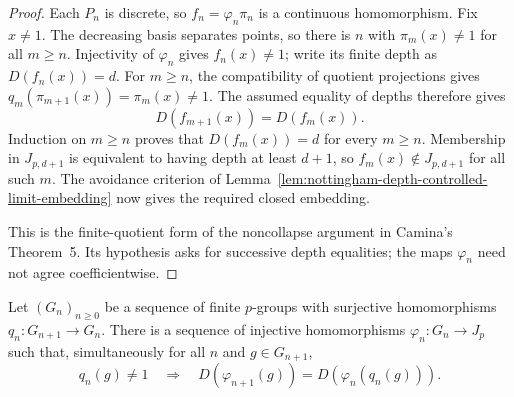 \begin{proof}
Each $P_n$ is discrete, so $f_n=\varphi_n\pi_n$ is a continuous
homomorphism. Fix $x\ne1$. The decreasing basis separates points,
so there is $n$ with $\pi_m(x)\ne1$ for all $m\ge n$.
Injectivity of $\varphi_n$ gives $f_n(x)\ne1$; write its finite
depth as $D(f_n(x))=d$.
For $m\ge n$, the compatibility of quotient projections gives
$q_m(\pi_{m+1}(x))=\pi_m(x)\ne1$. The assumed equality of depths
therefore gives
\[
 D(f_{m+1}(x))=D(f_m(x)).
\]
Induction on $m\ge n$ proves that $D(f_m(x))=d$ for every
$m\ge n$. Membership in $J_{p,d+1}$ is equivalent to having
depth at least $d+1$, so $f_m(x)\notin J_{p,d+1}$ for all such $m$.
The avoidance criterion of
Lemma~\ref{lem:nottingham-depth-controlled-limit-embedding}
now gives the required closed embedding.

This is the finite-quotient form of the noncollapse argument in
Camina's Theorem~5. Its hypothesis asks for successive depth
equalities; the maps $\varphi_n$ need not agree coefficientwise.
\end{proof}

\begin{lemma}
\label{lem:witt-depth-compatible-finite-group-sequence}
\leanok
Let $(G_n)_{n\ge0}$ be a sequence of finite $p$-groups with
surjective homomorphisms $q_n:G_{n+1}\to G_n$.
There is a sequence of injective homomorphisms
$\varphi_n:G_n\to J_p$ such that, simultaneously for all $n$
and $g\in G_{n+1}$,
\[
 q_n(g)\ne1\quad\Longrightarrow\quad
 D(\varphi_{n+1}(g))=D(\varphi_n(q_n(g))).
\]
\end{lemma}

